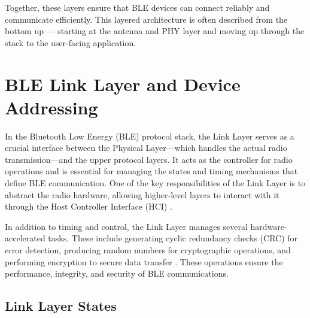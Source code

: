 Together, these layers ensure that BLE devices can connect reliably and communicate efficiently. This layered architecture is often described from the bottom up — starting at the antenna and PHY layer and moving up through the stack to the user-facing application.

\section{BLE Link Layer and Device Addressing}

In the Bluetooth Low Energy (BLE) protocol stack, the Link Layer serves as a crucial interface between the Physical Layer—which handles the actual radio transmission—and the upper protocol layers. It acts as the controller for radio operations and is essential for managing the states and timing mechanisms that define BLE communication. One of the key responsibilities of the Link Layer is to abstract the radio hardware, allowing higher-level layers to interact with it through the Host Controller Interface (HCI) \cite{introtoble}.

In addition to timing and control, the Link Layer manages several hardware-accelerated tasks. These include generating cyclic redundancy checks (CRC) for error detection, producing random numbers for cryptographic operations, and performing encryption to secure data transfer \cite{introtoble}. These operations ensure the performance, integrity, and security of BLE communications.

\subsection{Link Layer States}

